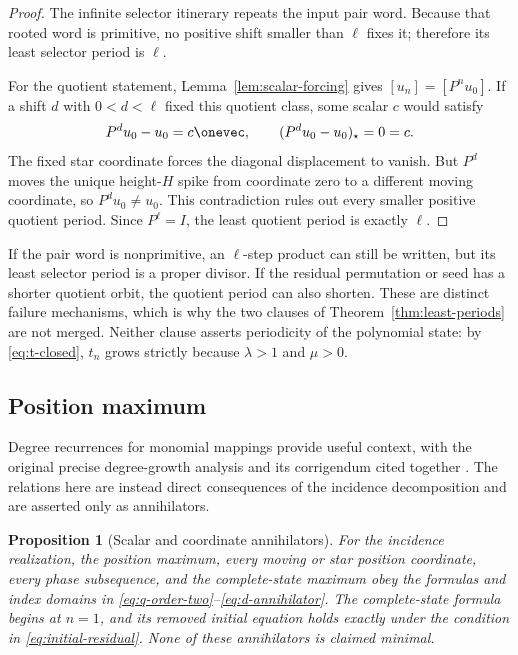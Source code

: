 \documentclass[11pt,letterpaper]{article}
\newtheorem{proposition}[theorem]{Proposition}
\theoremstyle{definition}
\theoremstyle{remark}
\numberwithin{equation}{section}
\begin{document}
\begin{proof}
The infinite selector itinerary repeats the input pair word.  Because that
rooted word is primitive, no positive shift smaller than \(\ell\) fixes it;
therefore its least selector period is \(\ell\).

For the quotient statement, Lemma~\ref{lem:scalar-forcing} gives
\([u_n]=[P^nu_0]\).  If a shift \(d\) with \(0<d<\ell\) fixed this quotient
class, some scalar \(c\) would satisfy
\begin{equation}
 P^du_0-u_0=c\onevec,
 \qquad
 (P^du_0-u_0)_\star=0=c.
 \label{eq:quotient-obstruction}
\end{equation}
The fixed star coordinate forces the diagonal displacement to vanish.  But
\(P^d\) moves the unique height-\(H\) spike from coordinate zero to a
different moving coordinate, so \(P^du_0\neq u_0\).  This contradiction
rules out every smaller positive quotient period.  Since \(P^\ell=I\), the
least quotient period is exactly \(\ell\).
\end{proof}

If the pair word is nonprimitive, an \(\ell\)-step product can still be
written, but its least selector period is a proper divisor.  If the residual
permutation or seed has a shorter quotient orbit, the quotient period can
also shorten.  These are distinct failure mechanisms, which is why the two
clauses of Theorem~\ref{thm:least-periods} are not merged.  Neither clause
asserts periodicity of the polynomial state: by
\eqref{eq:t-closed}, \(t_n\) grows strictly because \(\lambda>1\) and
\(\mu>0\).

\subsection{Position maximum}

Degree recurrences for monomial mappings provide useful context, with the
original precise degree-growth analysis and its corrigendum cited together
\citep{HasselblattPropp2007,HasselblattProppCorrigendum2007,BedfordKim2008}.
The relations here are instead direct consequences of the incidence
decomposition and are asserted only as annihilators.

\begin{proposition}[Scalar and coordinate annihilators]
\label{prop:recurrences}
For the incidence realization, the position maximum, every moving or star
position coordinate, every phase subsequence, and the complete-state maximum
obey the formulas and index domains in
\eqref{eq:q-order-two}--\eqref{eq:d-annihilator}.  The complete-state formula
begins at \(n=1\), and its removed initial equation holds exactly under the
condition in \eqref{eq:initial-residual}.  None of these annihilators is
claimed minimal.
\end{proposition}
\end{document}
